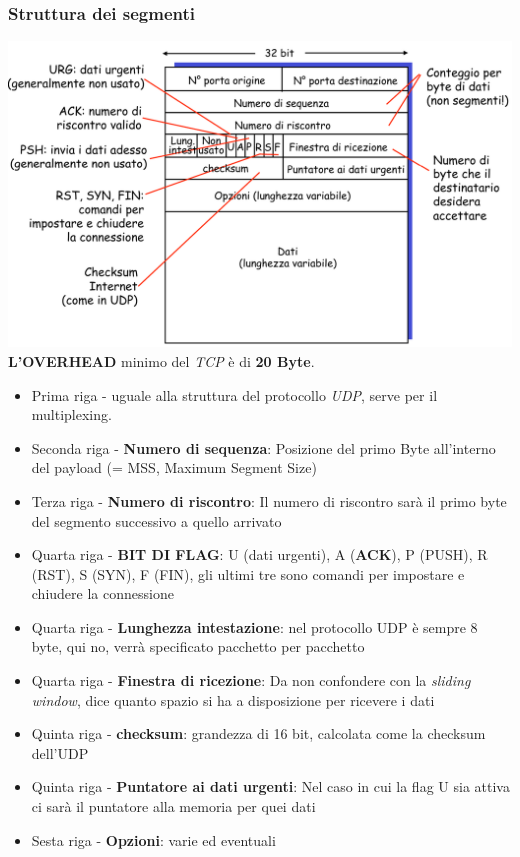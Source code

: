 \subsubsection{Struttura dei segmenti}
\includegraphics[width=\textwidth]{./img/segmento_tcp.png} 
\textbf{L'OVERHEAD} minimo del \textit{TCP} è di \textbf{20 Byte}. \\ 
\begin{itemize}
  \item Prima riga - uguale alla struttura del protocollo \textit{UDP}, serve per il multiplexing. 
  \item Seconda riga - \textbf{Numero di sequenza}: Posizione del primo Byte all'interno del payload (= MSS, Maximum Segment Size)
  \item Terza riga - \textbf{Numero di riscontro}: Il numero di riscontro sarà il primo byte del segmento successivo a quello arrivato
  \item Quarta riga - \textbf{BIT DI FLAG}: U (dati urgenti), A (\textbf{ACK}), P (PUSH), R (RST), S (SYN), F (FIN), gli ultimi tre sono comandi per impostare e chiudere la connessione 
  \item Quarta riga - \textbf{Lunghezza intestazione}: nel protocollo UDP è sempre 8 byte, qui no, verrà specificato pacchetto per pacchetto
  \item Quarta riga - \textbf{Finestra di ricezione}: Da non confondere con la \textit{sliding window}, dice quanto spazio si ha a disposizione per ricevere i dati 
  \item Quinta riga - \textbf{checksum}: grandezza di 16 bit, calcolata come la checksum dell'UDP
  \item Quinta riga - \textbf{Puntatore ai dati urgenti}: Nel caso in cui la flag U sia attiva ci sarà il puntatore alla memoria per quei dati
  \item Sesta riga - \textbf{Opzioni}: varie ed eventuali
\end{itemize}


